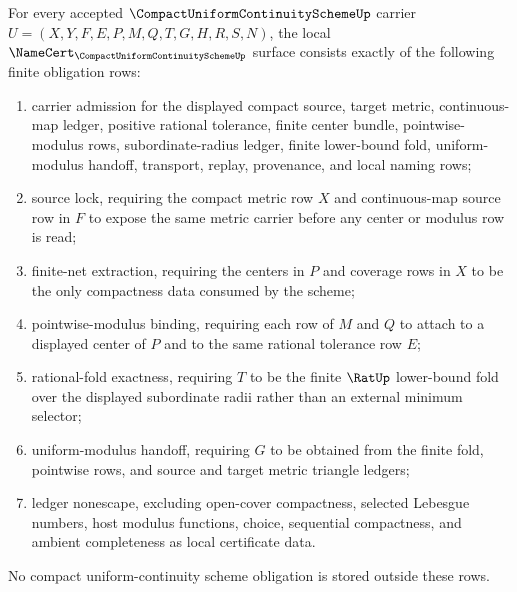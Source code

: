 \begin{theorem}
\label{thm:compact-uniform-continuity-scheme-namecert-obligations}
For every accepted $\CompactUniformContinuitySchemeUp$ carrier $U=(X,Y,F,E,P,M,Q,T,G,H,R,S,N)$, the local $\NameCert_{\CompactUniformContinuitySchemeUp}$ surface consists exactly of the following finite obligation rows:
\begin{enumerate}
\item carrier admission for the displayed compact source, target metric, continuous-map ledger, positive rational tolerance, finite center bundle, pointwise-modulus rows, subordinate-radius ledger, finite lower-bound fold, uniform-modulus handoff, transport, replay, provenance, and local naming rows;
\item source lock, requiring the compact metric row $X$ and continuous-map source row in $F$ to expose the same metric carrier before any center or modulus row is read;
\item finite-net extraction, requiring the centers in $P$ and coverage rows in $X$ to be the only compactness data consumed by the scheme;
\item pointwise-modulus binding, requiring each row of $M$ and $Q$ to attach to a displayed center of $P$ and to the same rational tolerance row $E$;
\item rational-fold exactness, requiring $T$ to be the finite $\RatUp$ lower-bound fold over the displayed subordinate radii rather than an external minimum selector;
\item uniform-modulus handoff, requiring $G$ to be obtained from the finite fold, pointwise rows, and source and target metric triangle ledgers;
\item ledger nonescape, excluding open-cover compactness, selected Lebesgue numbers, host modulus functions, choice, sequential compactness, and ambient completeness as local certificate data.
\end{enumerate}
No compact uniform-continuity scheme obligation is stored outside these rows.
\end{theorem}
